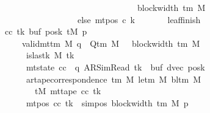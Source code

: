 \begin{isabellebody}
\ \ \ \ \ \ \ \ \ \ \ \ \ \ \ \ \ \ \ \ \ \ \ \ \ \ \ \ \ \ \ \ \ \ \ \ \ \ {\isacharplus}{\kern0pt}\ block{\isacharunderscore}{\kern0pt}width\ {\isacharparenleft}{\kern0pt}{\isasymGamma}{\isacharunderscore}{\kern0pt}tm\ M{\isacharparenright}{\kern0pt}{\isacharparenright}{\kern0pt}\isanewline
\ \ \ \ \ \ \ \ \ \ \ \ \ \ \ \ \ \ \ \ \ \ \ \ \ else\ mt{\isacharunderscore}{\kern0pt}pos\ c{}\ k{\isacharparenright}{\kern0pt}{\isacharparenright}{\kern0pt}{\isachardoublequoteclose}\isanewline
\ \ \ \ \ \ \ leaf{\isacharunderscore}{\kern0pt}finish{\isacharcolon}{\kern0pt}\isanewline
\ \ \ \ \ \ \ \ {\isachardoublequoteopen}{\isasymAnd}cc\ tk{\isacharprime}{\kern0pt}\ buf{\isacharprime}{\kern0pt}\ posk{\isacharprime}{\kern0pt}\ tM{\isacharprime}{\kern0pt}\ p{\isacharprime}{\kern0pt}{\isachardot}{\kern0pt}\isanewline
\ \ \ \ \ \ \ \ \ \ \ {\isasymlbrakk}\ valid{\isacharunderscore}{\kern0pt}mttm\ M{\isacharsemicolon}{\kern0pt}\ q\ {\isasymin}\ Q{\isacharunderscore}{\kern0pt}tm\ M{\isacharsemicolon}{\kern0pt}\ {}\ {\isasymle}\ block{\isacharunderscore}{\kern0pt}width\ {\isacharparenleft}{\kern0pt}{\isasymGamma}{\isacharunderscore}{\kern0pt}tm\ M{\isacharparenright}{\kern0pt}{\isacharsemicolon}{\kern0pt}\isanewline
\ \ \ \ \ \ \ \ \ \ \ \ \ is{\isacharunderscore}{\kern0pt}last{\isacharunderscore}{\kern0pt}k\ M\ tk{\isacharprime}{\kern0pt}{\isacharsemicolon}{\kern0pt}\isanewline
\ \ \ \ \ \ \ \ \ \ \ \ \ mt{\isacharunderscore}{\kern0pt}state\ cc\ {\isacharequal}{\kern0pt}\ {\isacharparenleft}{\kern0pt}q{\isacharcomma}{\kern0pt}\ AR{\isacharunderscore}{\kern0pt}SimRead{\isacharcomma}{\kern0pt}\ tk{\isacharprime}{\kern0pt}{\isacharcomma}{\kern0pt}\ {}{\isacharcomma}{\kern0pt}\ buf{\isacharprime}{\kern0pt}{\isacharcomma}{\kern0pt}\ dvec{\isacharcomma}{\kern0pt}\ posk{\isacharprime}{\kern0pt}{\isacharparenright}{\kern0pt}{\isacharsemicolon}{\kern0pt}\isanewline
\ \ \ \ \ \ \ \ \ \ \ \ \ ar{\isacharunderscore}{\kern0pt}tape{\isacharunderscore}{\kern0pt}correspondence\ {\isacharparenleft}{\kern0pt}{\isasymGamma}{\isacharunderscore}{\kern0pt}tm\ M{\isacharparenright}{\kern0pt}\ {\isacharparenleft}{\kern0pt}le{\isacharunderscore}{\kern0pt}tm\ M{\isacharparenright}{\kern0pt}\ {\isacharparenleft}{\kern0pt}bl{\isacharunderscore}{\kern0pt}tm\ M{\isacharparenright}{\kern0pt}\isanewline
\ \ \ \ \ \ \ \ \ \ \ \ \ \ \ tM{\isacharprime}{\kern0pt}\ {\isacharparenleft}{\kern0pt}mt{\isacharunderscore}{\kern0pt}tape\ cc\ tk{\isacharprime}{\kern0pt}{\isacharparenright}{\kern0pt}{\isacharsemicolon}{\kern0pt}\isanewline
\ \ \ \ \ \ \ \ \ \ \ \ \ mt{\isacharunderscore}{\kern0pt}pos\ cc\ tk{\isacharprime}{\kern0pt}\ {\isacharequal}{\kern0pt}\ sim{\isacharunderscore}{\kern0pt}pos\ {\isacharparenleft}{\kern0pt}block{\isacharunderscore}{\kern0pt}width\ {\isacharparenleft}{\kern0pt}{\isasymGamma}{\isacharunderscore}{\kern0pt}tm\ M{\isacharparenright}{\kern0pt}{\isacharparenright}{\kern0pt}\ p{\isacharprime}{\kern0pt}{\isacharsemicolon}{\kern0pt}\isanewline

\end{isabellebody}
